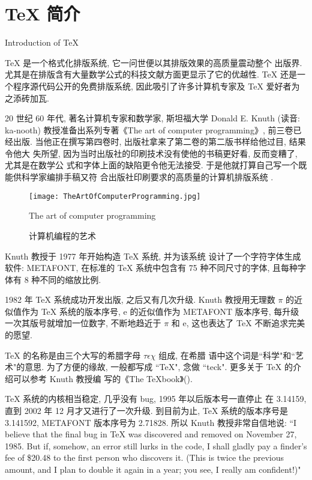 \chapter{\TeX{} 简介}{Introduction of \TeX}
\label{cha:IntroductionOfTeX}

\TeX{} \index{\TeX} 是一个格式化排版系统, 它一问世便以其排版效果的高质量震动整个
出版界. 尤其是在排版含有大量数学公式的科技文献方面更显示了它的优越性. \TeX{}
\index{\TeX} 还是一个程序源代码公开的免费排版系统, 因此吸引了许多计算机专家及
\TeX{} \index{\TeX} 爱好者为之添砖加瓦.

20 世纪 60 年代, 著名计算机专家和数学家, 斯坦福大学 Donald E. Knuth 
(读音: ka-nooth) 教授准备出系列专著《The art of computer programming》, 前三卷已
经出版. 当他正在撰写第四卷时, 出版社拿来了第二卷的第二版书样给他过目, 结果令他大
失所望, 因为当时出版社的印刷技术没有使他的书稿更好看, 反而变糟了, 尤其是在数学公
式和字体上面的缺陷更令他无法接受. 于是他就打算自己写一个既能供科学家编排手稿又符
合出版社印刷要求的高质量的计算机排版系统 .

\begin{figure}
  \centering
  \texttt{[image: TheArtOfComputerProgramming.jpg]}\\
  \caption{计算机编程的艺术}{The art of computer programming}
  \label{fig:TheArtOfComputerProgramming}
\end{figure}

Knuth  教授于 1977 年开始构造 \TeX{} \index{\TeX} 系统, 并为该系统
设计了一个字符字体生成软件: METAFONT, 在标准的 \TeX{} \index{\TeX}
系统中包含有 75 种不同尺寸的字体, 且每种字体有 8 种不同的缩放比例.

1982 年 \TeX{} \index{\TeX} 系统成功开发出版, 之后又有几次升级. Knuth 
教授用无理数 $\pi$ 的近似值作为 \TeX{} \index{\TeX} 系统的版本序号, $\mathrm{e}$
的近似值作为 METAFONT  版本序号, 每升级一次其版号就增加一位数字,
不断地趋近于 $\pi$ 和 $\mathrm{e}$, 这也表达了 \TeX{} \index{\TeX} 不断追求完美
的愿望.

\TeX{} \index{\TeX} 的名称是由三个大写的希腊字母 $\tau\epsilon\chi$ 组成, 在希腊
语中这个词是``科学"和``艺术"的意思. 为了方便的缘故, 一般都写成 ``TeX", 念做
``teck". 更多关于 \TeX{} \index{\TeX} 的介绍可以参考 Knuth  教授编
写的《The TeXbook》(\cite{Knuth1984}).

\TeX{} \index{\TeX} 系统的内核相当稳定, 几乎没有 bug, 1995 年以后版本号一直停止
在 3.14159, 直到 2002 年 12 月才又进行了一次升级. 到目前为止, \TeX{} \index{\TeX}
系统的版本序号是 3.141592, METAFONT  版本序号为 2.71828. 所以
Knuth  教授非常自信地说: ``I believe that the final bug in \TeX{}
\index{\TeX} was discovered and removed on November 27, 1985. But if,
somehow, an error still lurks in the code, I shall gladly pay a finder's fee of
\$20.48 to the first person who discovers it. (This is twice the previous amount,
and I plan to double it again in a year; you see, I really am confident!)"

